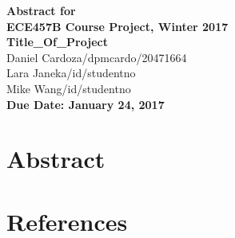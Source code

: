 \documentclass[12pt]{article}
\begin{document}
\begin{center}
{\Large\bf Abstract for}\\
\vspace{1mm}
{\Large\bf ECE457B Course Project, Winter 2017}\\
\vspace{2mm}
{\Large\bf Title\_Of\_Project}\\
\vspace{4mm}
{Daniel Cardoza/dpmcardo/20471664}\\
{Lara Janeka/id/studentno}\\
{Mike Wang/id/studentno}\\
\vspace{2mm}
\textbf{Due Date: January 24, 2017}
\end{center}

\def\question#1{\item[\bf #1.]}
\def\part#1{\item[\bf #1)]}
\newcommand{\pc}[1]{\mbox{\textbf{#1}}} %

\section{Abstract}

\section{References}
\end{document}

